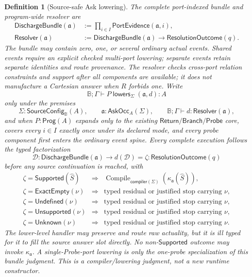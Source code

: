 \documentclass[11pt,oneside]{article}
\newtheorem{definition}{Definition}[section]
\newcommand{\B}{\mathbb B}
\newcommand{\Prog}{\mathsf{Prog}}
\newcommand{\Compile}{\operatorname{Compile}}
\newcommand{\AskRef}{\mathfrak a}
\begin{document}
\begin{definition}[Source-safe Ask lowering]
The complete port-indexed bundle and program-wide resolver are
\[
\boxed{
\begin{aligned}
\mathsf{DischargeBundle}(\AskRef)
&:=\prod_{i\in I}\mathsf{PortEvidence}(\AskRef,i),\\
\mathsf{Resolver}(\AskRef)
&:=\mathsf{DischargeBundle}(\AskRef)
  \to\mathsf{ResolutionOutcome}(q).
\end{aligned}
}
\]
The bundle may contain zero, one, or several ordinary actual events.  Shared events require an
explicit checked multi-port lowering; separate events retain separate identities and route
provenance.  The resolver checks cross-port relation constraints and support after all components
are available; it does not manufacture a Cartesian answer when \(R\) forbids one.
Write
\[
\B;\Gamma\vdash
P\;\mathsf{lowers}_{\Sigma}\;(\AskRef,d):A
\]
only under the premises
\[
\Sigma:\mathsf{SourceConfig}_{\B}(A),
\qquad
\AskRef:\mathsf{AskOcc}_A(\Sigma),
\qquad
\B;\Gamma\vdash d:\mathsf{Resolver}(\AskRef),
\]
and when \(P:\Prog(A)\) expands only to the existing
\(\mathsf{Return}/\mathsf{Branch}/\mathsf{Probe}\) core, covers every \(i\in I\) exactly once under
its declared mode, and every probe component first enters the ordinary event spine.  Every complete
execution follows the typed factorization
\[
\mathcal D:\mathsf{DischargeBundle}(\AskRef)
\longrightarrow
d(\mathcal D)=\zeta:\mathsf{ResolutionOutcome}(q)
\]
before any source continuation is reached, with
\[
\begin{array}{rcl}
\zeta=\mathsf{Supported}(\widehat S)
  &\Rightarrow& \Compile_{\mathsf{compiler}(\Sigma)}(\kappa_{\AskRef}(\widehat S)),\\
\zeta=\mathsf{ExactEmpty}(\nu)
  &\Rightarrow& \text{typed residual or justified stop carrying }\nu,\\
\zeta=\mathsf{Undefined}(\nu)
  &\Rightarrow& \text{typed residual or justified stop carrying }\nu,\\
\zeta=\mathsf{Unsupported}(\nu)
  &\Rightarrow& \text{typed residual or justified stop carrying }\nu,\\
\zeta=\mathsf{Unknown}(\nu)
  &\Rightarrow& \text{typed residual or justified stop carrying }\nu.
\end{array}
\]
The lower-level handler may preserve and route raw actuality, but it is ill typed for it to fill
the source answer slot directly.  No non-\(\mathsf{Supported}\) outcome may invoke
\(\kappa_{\AskRef}\).  A single-Probe-port lowering is only the one-probe specialization of this
bundle judgment.  This is a compiler/lowering judgment, not a new runtime constructor.
\end{definition}
\end{document}
